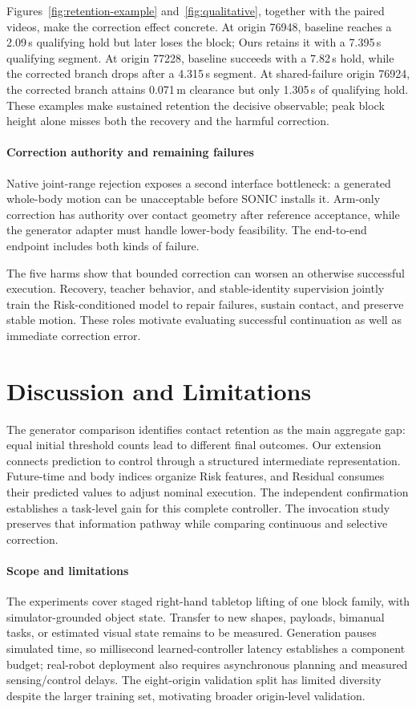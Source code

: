 \documentclass[letterpaper,10pt,conference]{ieeeconf}
\begin{document}
Figures~\ref{fig:retention-example} and~\ref{fig:qualitative}, together with the paired videos, make the correction effect concrete. At origin 76948, baseline reaches a 2.09\,s qualifying hold but later loses the block; Ours retains it with a 7.395\,s qualifying segment. At origin 77228, baseline succeeds with a 7.82\,s hold, while the corrected branch drops after a 4.315\,s segment. At shared-failure origin 76924, the corrected branch attains 0.071\,m clearance but only 1.305\,s of qualifying hold. These examples make sustained retention the decisive observable; peak block height alone misses both the recovery and the harmful correction.

\paragraph{Correction authority and remaining failures}
Native joint-range rejection exposes a second interface bottleneck: a generated whole-body motion can be unacceptable before SONIC installs it. Arm-only correction has authority over contact geometry after reference acceptance, while the generator adapter must handle lower-body feasibility. The end-to-end endpoint includes both kinds of failure.

The five harms show that bounded correction can worsen an otherwise successful execution. Recovery, teacher behavior, and stable-identity supervision jointly train the Risk-conditioned model to repair failures, sustain contact, and preserve stable motion. These roles motivate evaluating successful continuation as well as immediate correction error.



\section{Discussion and Limitations}
The generator comparison identifies contact retention as the main aggregate gap: equal initial threshold counts lead to different final outcomes. Our extension connects prediction to control through a structured intermediate representation. Future-time and body indices organize Risk features, and Residual consumes their predicted values to adjust nominal execution. The independent confirmation establishes a task-level gain for this complete controller. The invocation study preserves that information pathway while comparing continuous and selective correction.

\paragraph{Scope and limitations}
The experiments cover staged right-hand tabletop lifting of one block family, with simulator-grounded object state. Transfer to new shapes, payloads, bimanual tasks, or estimated visual state remains to be measured. Generation pauses simulated time, so millisecond learned-controller latency establishes a component budget; real-robot deployment also requires asynchronous planning and measured sensing/control delays. The eight-origin validation split has limited diversity despite the larger training set, motivating broader origin-level validation.
\end{document}
